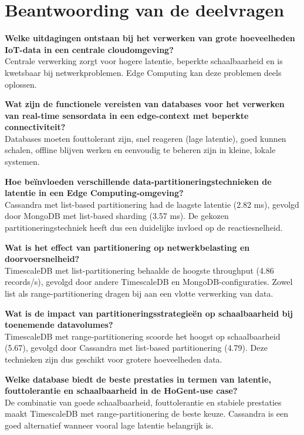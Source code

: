 \section{Beantwoording van de deelvragen}

\textbf{Welke uitdagingen ontstaan bij het verwerken van grote hoeveelheden IoT-data in een centrale cloudomgeving?} \\
Centrale verwerking zorgt voor hogere latentie, beperkte schaalbaarheid en is kwetsbaar bij netwerkproblemen. Edge Computing kan deze problemen deels oplossen.

\textbf{Wat zijn de functionele vereisten van databases voor het verwerken van real-time sensordata in een edge-context met beperkte connectiviteit?} \\
Databases moeten fouttolerant zijn, snel reageren (lage latentie), goed kunnen schalen, offline blijven werken en eenvoudig te beheren zijn in kleine, lokale systemen.

\textbf{Hoe beïnvloeden verschillende data-partitioneringstechnieken de latentie in een Edge Computing-omgeving?} \\
Cassandra met list-based partitionering had de laagste latentie (2.82 ms), gevolgd door MongoDB met list-based sharding (3.57 ms). De gekozen partitioneringstechniek heeft dus een duidelijke invloed op de reactiesnelheid.

\textbf{Wat is het effect van partitionering op netwerkbelasting en doorvoersnelheid?} \\
TimescaleDB met list-partitionering behaalde de hoogste throughput (4.86 records/s), gevolgd door andere TimescaleDB en MongoDB-configuraties. Zowel list als range-partitionering dragen bij aan een vlotte verwerking van data.

\textbf{Wat is de impact van partitioneringsstrategieën op schaalbaarheid bij toenemende datavolumes?} \\
TimescaleDB met range-partitionering scoorde het hoogst op schaalbaarheid (5.67), gevolgd door Cassandra met list-based partitionering (4.79). Deze technieken zijn dus geschikt voor grotere hoeveelheden data.

\textbf{Welke database biedt de beste prestaties in termen van latentie, fouttolerantie en schaalbaarheid in de HoGent-use case?} \\
De combinatie van goede schaalbaarheid, fouttolerantie en stabiele prestaties maakt TimescaleDB met range-partitionering de beste keuze. Cassandra is een goed alternatief wanneer vooral lage latentie belangrijk is.

